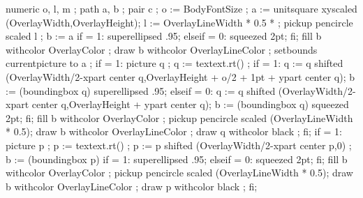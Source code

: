 \def\Eqalign#1{\Matrix{[n=2,align={right,left}]#1}}%

\def\Et{\text{ et }}%
\def\EtQ{\quad\Et\quad}
\def\EtQQ{\qquad\Et\qquad}

\def\Exemple#1{{\tenpoint Exemple : #1\crlf\crlf}}
\def\Exercise#1{{\tenpoint Exercice : #1\crlf\crlf}}

\let\F\over
\def\Inframed#1{\inframed[toffset=-0.4ex,boffset=-0.4ex]{#1}}%

\def\Matrix#1{\startmatrix#1\stopmatrix}%
\def\Notation{\noindent{\it Notation}}%

\def\Le{<}

\def\Ou{\text{ ou }}%
\def\OuQ{\quad\Ou\quad}
\def\OuQQ{\qquad\Ou\qquad}

\def\Proof#1{{\tenpoint Preuve : #1\crlf\crlf}}

  numeric o, l, m ; path a, b ; pair c ; 
  o := BodyFontSize ;
  a := unitsquare xyscaled (OverlayWidth,OverlayHeight);
  l := OverlayLineWidth * 0.5 * ;
  pickup pencircle scaled l ;
  b := a if   = 1: superellipsed .95; 
  elseif   = 0: squeezed 2pt; fi;
  fill b withcolor OverlayColor ;
  draw b withcolor OverlayLineColor ;
  setbounds currentpicture to a ;
  if  = 1:
    picture q ;
    q := textext.rt() ;
    if   = 1:
      q := q shifted (OverlayWidth/2-xpart center q,OverlayHeight + o/2 + 1pt + ypart center q);
      b := (boundingbox q)   superellipsed .95;  
    elseif   = 0:
        q := q shifted (OverlayWidth/2-xpart center q,OverlayHeight + ypart center q);
        b := (boundingbox q)  squeezed 2pt;  
    fi;
    fill b withcolor OverlayColor ;
    pickup pencircle scaled  (OverlayLineWidth * 0.5);
    draw b withcolor OverlayLineColor ;
    draw q withcolor black ;
  fi;
  if  = 1:
    picture p ;
    p := textext.rt() ;
    p := p shifted (OverlayWidth/2-xpart center p,0) ;
    b := (boundingbox p) if   = 1: superellipsed .95; 
     elseif   = 0: squeezed 2pt; fi;
    fill b withcolor OverlayColor ;
    pickup pencircle scaled  (OverlayLineWidth * 0.5);
    draw b withcolor OverlayLineColor ;
    draw p withcolor black ;
  fi;
\stopuniqueMPgraphic    

